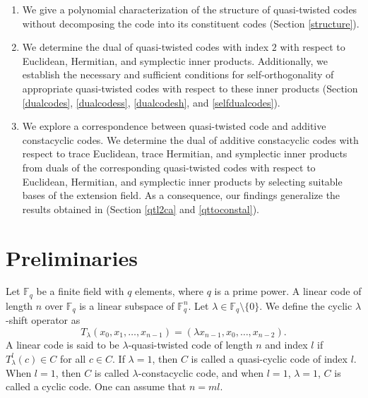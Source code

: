 \documentclass[12 pt]{extarticle}
\numberwithin{equation}{section}
\theoremstyle{definition}
\begin{document}
 \begin{enumerate}
     \item  We give a polynomial characterization of the structure of quasi-twisted codes without decomposing the code into its constituent codes (Section \ref{structure}).
     
     \item We determine the dual of quasi-twisted codes with index $2$ with respect to Euclidean, Hermitian, and symplectic inner products. Additionally, we establish the necessary and sufficient conditions for self-orthogonality of appropriate quasi-twisted codes with respect to these inner products (Section \ref{dualcodes}, \ref{dualcodess}, \ref{dualcodesh}, and \ref{selfdualcodes}). 
     
     
     \item  We explore a correspondence between quasi-twisted code and additive constacyclic codes. We determine the dual of additive constacyclic codes with respect to trace Euclidean, trace Hermitian, and symplectic inner products from duals of the corresponding quasi-twisted codes with respect to Euclidean, Hermitian, and symplectic inner products by selecting suitable bases of the extension field. As a consequence, our findings generalize the results obtained in \cite{reza2025,guneri2018,shi2022,Verma2024} (Section \ref{qtl2ca} and \ref{qttoconstal}).
 \end{enumerate}


   


\section{Preliminaries}\label{pre}
Let $\mathbb{F}_q$ be a finite field with $q$ elements, where $q$ is a prime power. A linear code of length $n$ over $\mathbb{F}_q$ is a linear subspace of $\mathbb{F}_q^n$.
 Let $\lambda \in \mathbb{F}_q\setminus \{0\}$. We define the cyclic $\lambda$-shift operator as 
 $$T_{\lambda}(x_0,x_1,\dots,x_{n-1})=(\lambda x_{n-1},x_0,\dots,x_{n-2}).$$
 A linear code is said to be $\lambda$-quasi-twisted code of length $n$ and index $l$  if $T_{\lambda}^l(c)\in C$ for all $c\in C$. If $\lambda=1$, then $C$ is called a quasi-cyclic code of index $l$. When $l=1$, then $C$ is called $\lambda$-constacyclic code, and when $l=1$, $\lambda=1$, $C$ is called a cyclic code. One can assume that $n=ml$. 
\end{document}
